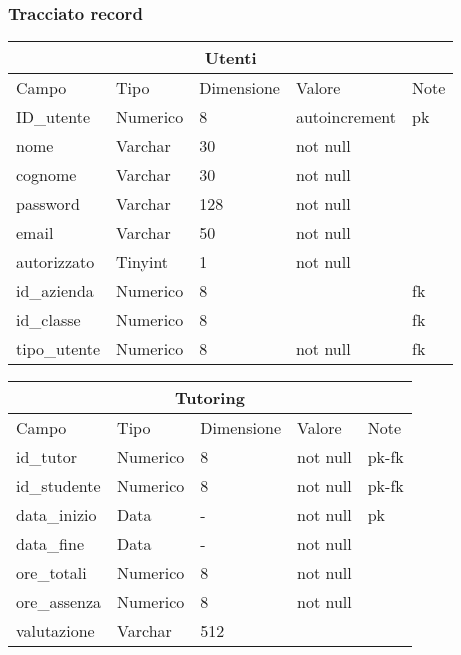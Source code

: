 \documentclass[12pt]{article}
\begin{document}
\subsubsection{Tracciato record}
\begin{center}
    \begin{tabular}{|p{3.0cm}||p{1.6cm}|p{2cm}|p{2.5cm}|p{1cm}|}
        \hline
        \multicolumn{5}{|c|}{Utenti} \\
        \hline
        Campo & Tipo & Dimensione & Valore & Note \\
        \hline
        ID\_utente & Numerico & 8 & autoincrement & pk \\
        \hline
        nome & Varchar & 30 & not null & \\
        \hline
        cognome & Varchar & 30  & not null & \\
        \hline
        password & Varchar & 128 & not null & \\
        \hline
        email & Varchar & 50 & not null & \\
        \hline
        autorizzato & Tinyint & 1 & not null &\\
        \hline
        id\_azienda & Numerico & 8 & & fk \\
        \hline
        id\_classe & Numerico  & 8 & & fk \\
        \hline
        tipo\_utente & Numerico & 8 & not null  & fk\\
        \hline
    \end{tabular}
    
    \bigskip
    \begin{tabular}{|p{3.0cm}||p{1.6cm}|p{2cm}|p{2.5cm}|p{1cm}|}
        \hline
        \multicolumn{5}{|c|}{Tutoring} \\
        \hline
        Campo & Tipo & Dimensione & Valore & Note \\
        \hline
        id\_tutor & Numerico & 8 & not null & pk-fk \\
        \hline
        id\_studente & Numerico & 8 & not null & pk-fk \\
        \hline
        data\_inizio & Data & -  & not null & pk\\
        \hline
        data\_fine & Data & -  & not null & \\
        \hline
        ore\_totali & Numerico & 8 & not null & \\
        \hline
        ore\_assenza & Numerico  & 8 & not null &\\
        \hline
        valutazione & Varchar & 512 &  & \\
        \hline
    \end{tabular}
    

\end{center}
\end{document}
